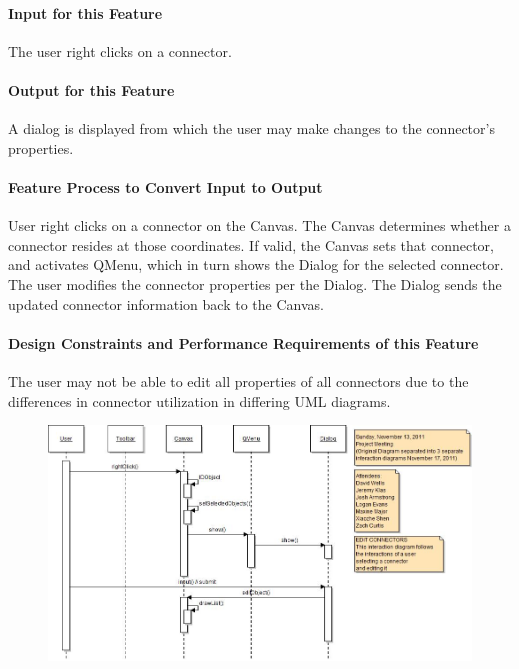 \documentclass[twoside,letterpaper]{article}
\begin{document}
{\paragraph[Input for this Feature]{Input for this Feature}
{\color{black}
The user right clicks on a connector.
}

\paragraph{Output for this Feature}
{\color{black}
A dialog is displayed from which the user may make changes to the connector{\textquoteright}s properties.
}

\paragraph{Feature Process to Convert Input to Output}
{\color{black}
User right clicks on a connector on the Canvas. The Canvas determines whether a connector resides at those coordinates. If valid, the Canvas sets that connector, and activates QMenu, which in turn shows the Dialog for the selected connector.
The user modifies the connector properties per the Dialog.  The Dialog sends the updated connector information back to the Canvas.
}

\paragraph{Design Constraints and Performance Requirements of this Feature}
{\color{black}
The user may not be able to edit all properties of all connectors due to the differences in connector utilization in differing UML diagrams.
}
\bigskip
\bigskip

\begin{figure}[h]
\centering
\includegraphics[width=6.0in]{IntEditConn.jpg}
\end{figure}

}
\end{document}
